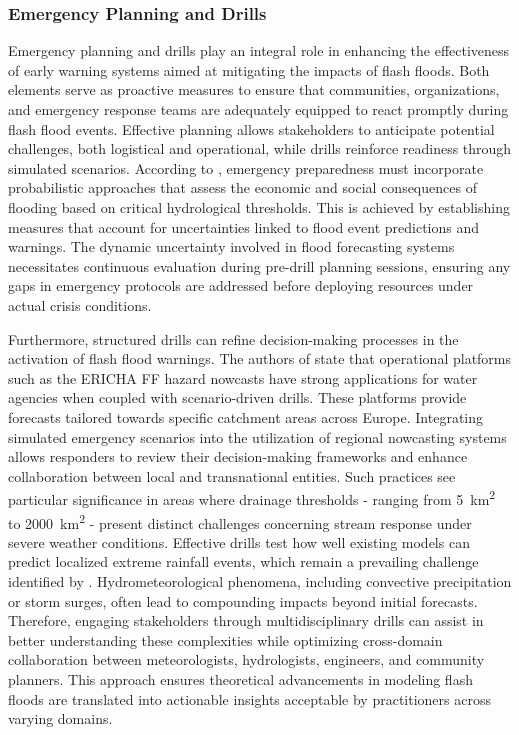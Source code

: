 \subsubsection{Emergency Planning and Drills}
Emergency planning and drills play an integral role in enhancing the effectiveness of early warning systems aimed at mitigating the impacts of flash floods. Both elements serve as proactive measures to ensure that communities, organizations, and emergency response teams are adequately equipped to react promptly during flash flood events. Effective planning allows stakeholders to anticipate potential challenges, both logistical and operational, while drills reinforce readiness through simulated scenarios.
According to \citep{Henao2022}, emergency preparedness must incorporate probabilistic approaches that assess the economic and social consequences of flooding based on critical hydrological thresholds. This is achieved by establishing measures that account for uncertainties linked to flood event predictions and warnings. The dynamic uncertainty involved in flood forecasting systems necessitates continuous evaluation during pre-drill planning sessions, ensuring any gaps in emergency protocols are addressed before deploying resources under actual crisis conditions.

Furthermore, structured drills can refine decision-making processes in the activation of flash flood warnings. The authors of \citep{Ritter2021a} state that operational platforms such as the ERICHA FF hazard nowcasts have strong applications for water agencies when coupled with scenario-driven drills. These platforms provide forecasts tailored towards specific catchment areas across Europe. Integrating simulated emergency scenarios into the utilization of regional nowcasting systems allows responders to review their decision-making frameworks and enhance collaboration between local and transnational entities. Such practices see particular significance in areas where drainage thresholds - ranging from \SI{5}{\kilo\metre\squared} to \SI{2000}{\kilo\metre\squared} - present distinct challenges concerning stream response under severe weather conditions.
Effective drills test how well existing models can predict localized extreme rainfall events, which remain a prevailing challenge identified by \citep{Abegaz2024}\citep{Zanchetta2020}. Hydrometeorological phenomena, including convective precipitation or storm surges, often lead to compounding impacts beyond initial forecasts. Therefore, engaging stakeholders through multidisciplinary drills can assist in better understanding these complexities while optimizing cross-domain collaboration between meteorologists, hydrologists, engineers, and community planners. This approach ensures theoretical advancements in modeling flash floods are translated into actionable insights acceptable by practitioners across varying domains.

